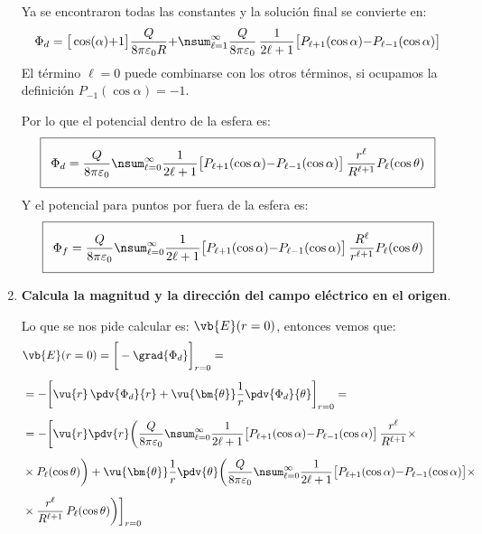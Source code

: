 \begin{enumerate}
Ya se encontraron todas las constantes y la solución final se convierte en:
\begin{align*}
\Phi_{d} = \big[ \cos (\alpha) {+} 1 \big] \dfrac{Q}{8 \pi \varepsilon_{0} R} {+} \nsum_{\ell=1}^{\infty} \dfrac{Q}{8 \pi \varepsilon_{0}} \, \dfrac{1}{2 \ell + 1} \big[ P_{\ell+1} (\cos \alpha) {-} P_{\ell-1} (\cos \alpha) \big]
\end{align*}
El término $\ell =0$ puede combinarse con los otros términos, si ocupamos la definición $P_{-1} (\cos \alpha ) = -1$.
\par
Por lo que el potencial dentro de la esfera es:
\begin{align*}
\addtolength{\fboxsep}{5pt}\boxed{
\Phi_{d} = \dfrac{Q}{8 \pi \varepsilon_{0}} \nsum_{\ell=0}^{\infty} \dfrac{1}{2 \ell + 1} \big[ P_{\ell+1} (\cos \alpha) {-} P_{\ell-1} (\cos \alpha) \big] \, \dfrac{r^{\ell}}{R^{\ell+1}} P_{\ell} (\cos \theta) } 
\end{align*}
Y el potencial para puntos por fuera de la esfera es:
\begin{align*}
\addtolength{\fboxsep}{5pt}\boxed{
\Phi_{f} = \dfrac{Q}{8 \pi \varepsilon_{0}} \nsum_{\ell=0}^{\infty} \dfrac{1}{2 \ell + 1} \big[ P_{\ell+1} (\cos \alpha) {-} P_{\ell-1} (\cos \alpha) \big] \, \dfrac{R^{\ell}}{r^{\ell+1}} P_{\ell} (\cos \theta) } 
\end{align*}
\item \textbf{Calcula la magnitud y la dirección del campo eléctrico en el origen}.
\par
Lo que se nos pide calcular es: $\vb{E} (r = 0)$, entonces vemos que:
\begin{align*}
&\vb{E} (r = 0) = \bigg[ - \grad{\Phi_{d}} \bigg]_{r=0} = \\[0.5em]
&= - \bigg[ \vu{r} \, \pdv{\Phi_{d}}{r} + \vu{\bm{\theta}} \dfrac{1}{r} \pdv{\Phi_{d}}{\theta} \bigg]_{r=0} = \\[0.5em]
&= -\bigg[ \vu{r} \pdv{r} \bigg( \dfrac{Q}{8 \pi \varepsilon_{0}} \nsum_{\ell=0}^{\infty} \dfrac{1}{2 \ell + 1} \big[ P_{\ell+1} (\cos \alpha) {-} P_{\ell-1} (\cos \alpha) \big] \, \dfrac{r^{\ell}}{R^{\ell+1}} \times \\[0.5em]
&\times P_{\ell} (\cos \theta) \bigg) + \vu{\bm{\theta}} \dfrac{1}{r}  \pdv{\theta} \bigg( \dfrac{Q}{8 \pi \varepsilon_{0}} \nsum_{\ell=0}^{\infty} \dfrac{1}{2 \ell + 1} \big[ P_{\ell+1} (\cos \alpha) {-} P_{\ell-1} (\cos \alpha) \big] \times \\[0.5em]
&\times \dfrac{r^{\ell}}{R^{\ell+1}} \, P_{\ell} (\cos \theta) \bigg) \bigg]_{r=0}
\end{align*}

\end{enumerate}
